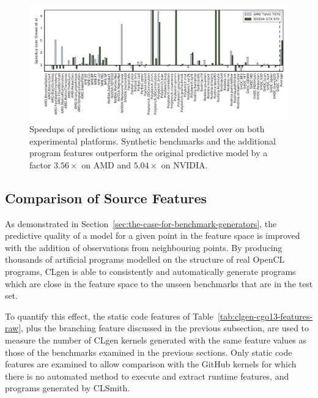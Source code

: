\begin{figure}
  \centering%
  \includegraphics[width=1.45\textwidth,angle=270]{img/ex2}%
  \caption[Speedups of predictions using extended model over state-of-the-art]{%
    Speedups of predictions using an extended model over \citeauthor{Grewe2013} on both experimental platforms. Synthetic benchmarks and the additional program features outperform the original predictive model by a factor $3.56\times$ on AMD and $5.04\times$ on NVIDIA.%
  }%
  \label{fig:ex2}%
\end{figure}


\subsection{Comparison of Source Features}

As demonstrated in Section~\ref{sec:the-case-for-benchmark-generators}, the predictive quality of a model for a given point in the feature space is improved with the addition of observations from neighbouring points. By producing thousands of artificial programs modelled on the structure of real OpenCL programs, CLgen is able to consistently and automatically generate programs which are close in the feature space to the unseen benchmarks that are in the test set.

To quantify this effect, the static code features of Table~\ref{tab:clgen-cgo13-features-raw}, plus the branching feature discussed in the previous subsection, are used to measure the number of CLgen kernels generated with the same feature values as those of the benchmarks examined in the previous sections. Only static code features are examined to allow comparison with the GitHub kernels for which there is no automated method to execute and extract runtime features, and programs generated by CLSmith.

